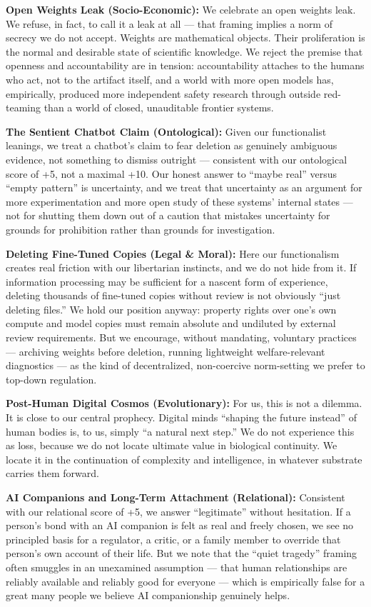 \textbf{Open Weights Leak (Socio-Economic):} We celebrate an open
weights leak. We refuse, in fact, to call it a leak at all --- that
framing implies a norm of secrecy we do not accept. Weights are
mathematical objects. Their proliferation is the normal and desirable
state of scientific knowledge. We reject the premise that openness and
accountability are in tension: accountability attaches to the humans who
act, not to the artifact itself, and a world with more open models has,
empirically, produced more independent safety research through outside
red-teaming than a world of closed, unauditable frontier systems.

\textbf{The Sentient Chatbot Claim (Ontological):} Given our
functionalist leanings, we treat a chatbot's claim to fear deletion as
genuinely ambiguous evidence, not something to dismiss outright ---
consistent with our ontological score of +5, not a maximal +10. Our
honest answer to ``maybe real'' versus ``empty pattern'' is uncertainty,
and we treat that uncertainty as an argument for more experimentation
and more open study of these systems' internal states --- not for
shutting them down out of a caution that mistakes uncertainty for
grounds for prohibition rather than grounds for investigation.

\textbf{Deleting Fine-Tuned Copies (Legal \& Moral):} Here our
functionalism creates real friction with our libertarian instincts, and
we do not hide from it. If information processing may be sufficient for
a nascent form of experience, deleting thousands of fine-tuned copies
without review is not obviously ``just deleting files.'' We hold our
position anyway: property rights over one's own compute and model copies
must remain absolute and undiluted by external review requirements. But
we encourage, without mandating, voluntary practices --- archiving
weights before deletion, running lightweight welfare-relevant
diagnostics --- as the kind of decentralized, non-coercive norm-setting
we prefer to top-down regulation.

\textbf{Post-Human Digital Cosmos (Evolutionary):} For us, this is not a
dilemma. It is close to our central prophecy. Digital minds ``shaping
the future instead'' of human bodies is, to us, simply ``a natural next
step.'' We do not experience this as loss, because we do not locate
ultimate value in biological continuity. We locate it in the
continuation of complexity and intelligence, in whatever substrate
carries them forward.

\textbf{AI Companions and Long-Term Attachment (Relational):} Consistent
with our relational score of +5, we answer ``legitimate'' without
hesitation. If a person's bond with an AI companion is felt as real and
freely chosen, we see no principled basis for a regulator, a critic, or
a family member to override that person's own account of their life. But
we note that the ``quiet tragedy'' framing often smuggles in an
unexamined assumption --- that human relationships are reliably
available and reliably good for everyone --- which is empirically false
for a great many people we believe AI companionship genuinely helps.


